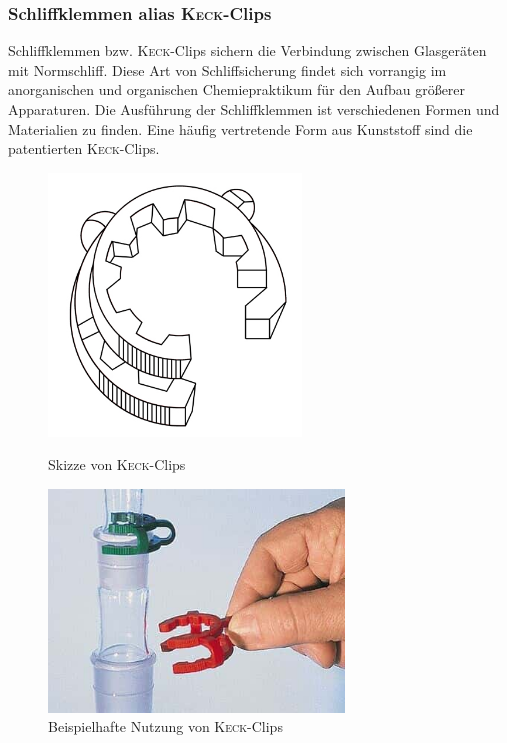 \subsubsection*{Schliffklemmen alias \textsc{Keck}-Clips}
Schliffklemmen bzw. \textsc{Keck}-Clips sichern die Verbindung zwischen Glasgeräten mit Normschliff. Diese Art von Schliffsicherung findet sich vorrangig im anorganischen und organischen Chemiepraktikum für den Aufbau größerer Apparaturen. Die Ausführung der Schliffklemmen ist verschiedenen Formen und Materialien zu finden. Eine häufig vertretende Form aus Kunststoff  sind die patentierten \textsc{Keck}-Clips.

\begin{figure}[h!]
	\begin{minipage}[b]{.4\textwidth} %
		\centering
		\includegraphics[width=0.6\textwidth]{img/keck_clips}
		\caption{Skizze von \textsc{Keck}-Clips}
	\end{minipage}
	\hspace{.1\linewidth}%
	\begin{minipage}[b]{.4\textwidth} %
		\centering
		\includegraphics[width=0.7\textwidth]{img/keck_clips_2}
		\caption{Beispielhafte Nutzung von \textsc{Keck}-Clips}
	\end{minipage}
\end{figure}
\FloatBarrier

